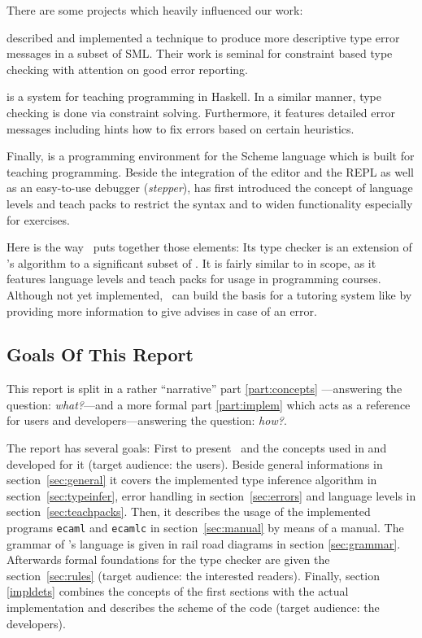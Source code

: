 There are some projects which heavily influenced our work:

\citet{haackwells04} described and implemented a technique to produce more
descriptive type error messages in a subset of SML.  
Their work is seminal for constraint based type checking with attention 
on good error reporting.

 \citep{helium-hw03} is a system for teaching programming 
in Haskell. In a similar manner, type checking is done via constraint 
solving. Furthermore, it features detailed error messages including 
hints how to fix errors based on certain heuristics.

Finally,  \citep{Felleisen98thedrscheme} is a programming 
environment for the Scheme language which is built for teaching
programming.  Beside the integration of the editor and the REPL as well as an
easy-to-use debugger (\emph{stepper}),  has first introduced
the concept of language levels and teach packs to restrict the syntax and
to widen functionality especially for exercises.

Here is the way \easyocaml\ puts together those elements: Its type checker is
an extension of \citet{haackwells04}'s  algorithm to a significant subset of
\ocaml.
It is fairly similar to  in scope, as it features language
levels and teach packs for usage in programming courses.
Although not yet implemented, \easyocaml\ can build the basis for a tutoring
system like  by providing more information to give advises in
case of an error.


\subsection*{Goals Of This Report}

This report is split in a rather ``narrative'' part \ref{part:concepts}%
---answering the question: \emph{what?}---and a more formal part \ref{part:implem}
which acts as a reference for users and developers---answering the question:
\emph{how?}.

The report has several goals:
First to present \easyocaml\ and the concepts used in and developed for it
(target audience: the users). Beside general informations in
section~\ref{sec:general} it covers the implemented type inference algorithm in
section~\ref{sec:typeinfer}, error handling in section~\ref{sec:errors} and
language levels in section~\ref{sec:teachpacks}.
Then, it describes the usage of the implemented programs \texttt{ecaml} and
\texttt{ecamlc} in section~\ref{sec:manual} by means of a manual.
The grammar of \easyocaml's language is given in rail road diagrams in section
\ref{sec:grammar}.
Afterwards formal foundations for the type checker are given the
section~\ref{sec:rules} (target audience: the interested readers).
Finally, section \ref{impldets} combines the concepts of the first sections with
the actual implementation and describes the scheme of the code (target audience:
the developers).

